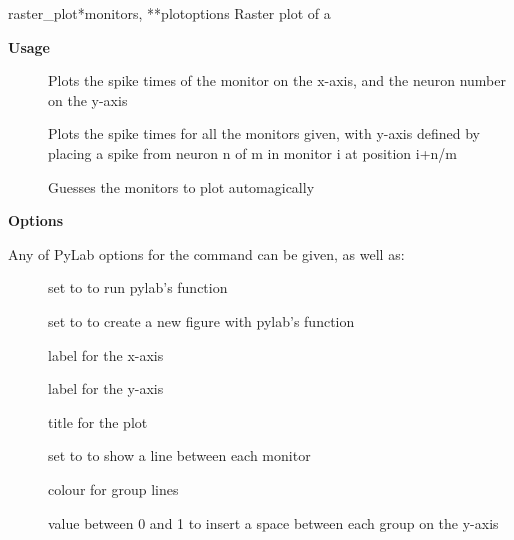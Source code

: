 \documentclass[letterpaper,10pt,english]{manual}
\begin{document}
\hypertarget{brian.raster_plot}{}\begin{funcdesc}{raster\_plot}{*monitors, **plotoptions}
Raster plot of a \hyperlink{brian.SpikeMonitor}{}

\textbf{Usage}
\begin{description}
\item[] \leavevmode
Plots the spike times of the monitor
on the x-axis, and the neuron number on the y-axis

\item[] \leavevmode
Plots the spike times
for all the monitors given, with y-axis defined by placing a spike
from neuron n of m in monitor i at position i+n/m

\item[] \leavevmode
Guesses the monitors to plot automagically

\end{description}

\textbf{Options}

Any of PyLab options for the  command can be given, as well as:
\begin{description}
\item[] \leavevmode
set to  to run pylab's  function

\item[] \leavevmode
set to  to create a new figure with pylab's  function

\item[] \leavevmode
label for the x-axis

\item[] \leavevmode
label for the y-axis

\item[] \leavevmode
title for the plot

\item[] \leavevmode
set to  to show a line between each monitor

\item[] \leavevmode
colour for group lines

\item[] \leavevmode
value between 0 and 1 to insert a space between
each group on the y-axis


\end{description}
\end{funcdesc}
\end{document}
